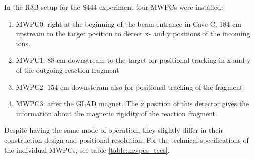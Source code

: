 In the R3B setup for the S444 experiment four MWPCs were installed:\newline
\begin{enumerate}
\item MWPC0: right at the beginning of the beam entrance in Cave C, $184$ cm upstream to the target position to detect x- and y positions of the incoming ions.
\item MWPC1: $88$ cm downstream to the target for positional tracking in x and y of the outgoing reaction fragment
\item MWPC2: $154$ cm downsteram also for positional tracking of the fragment
\item MWPC3: after the GLAD magnet. The x position of this detector gives the information about the magnetic rigidity of the reaction fragment.  %
\end{enumerate}
Despite having the same mode of operation, they slightly differ in their construction design and positional resolution. For the technical specifications of the individual MWPCs, see table \ref{table:mwpcs_tecs}.

